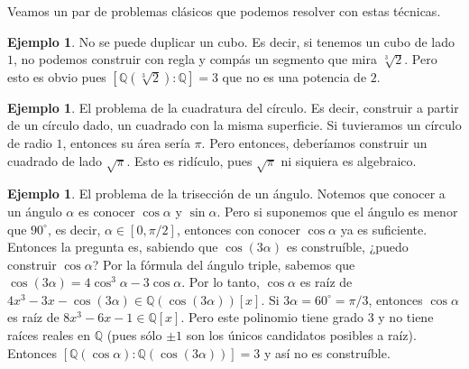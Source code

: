 \documentclass[12pt]{book}
\theoremstyle{definition}
\newtheorem{ex}[teo]{Ejemplo}
\newcommand{\QQ}{\mathbb{Q}}
\begin{document}
Veamos un par de problemas clásicos que podemos resolver con estas técnicas.

\begin{ex}
No se puede duplicar un cubo. Es decir, si tenemos un cubo de lado $1$, no podemos construir con regla y compás un segmento que mira $\sqrt[3]{2}$. Pero esto es obvio pues $[\QQ(\sqrt[3]{2}):\QQ]=3$ que no es una potencia de $2$.
\end{ex}

\begin{ex}
El problema de la cuadratura del círculo. Es decir, construir a partir de un círculo dado, un cuadrado con la misma superficie. Si tuvieramos un círculo de radio $1$, entonces su área sería $\pi$. Pero entonces, deberíamos construir un cuadrado de lado $\sqrt{\pi}$. Esto es ridículo, pues $\sqrt{\pi}$ ni siquiera es algebraico.
\end{ex}

\begin{ex}
El problema de la trisección de un ángulo. Notemos que conocer a un ángulo $\alpha$ es conocer $\cos \alpha$ y $\sin\alpha$. Pero si suponemos que el ángulo es menor que $90^\circ$, es decir, $\alpha\in [0,\pi/2]$, entonces con conocer $\cos\alpha$ ya es suficiente. Entonces la pregunta es, sabiendo que $\cos(3\alpha)$ es construíble, ¿puedo construir $\cos\alpha$? Por la fórmula del ángulo triple, sabemos que $\cos (3\alpha) = 4\cos^3 \alpha - 3\cos \alpha$. Por lo tanto, $\cos\alpha$ es raíz de $4x^3 - 3x - \cos(3\alpha)\in\QQ(\cos(3\alpha))[x]$. Si $3\alpha = 60^\circ = \pi/3$, entonces $\cos \alpha$ es raíz de $8x^3 - 6x -1\in\QQ[x]$. Pero este polinomio tiene grado $3$ y no tiene raíces reales en $\QQ$ (pues sólo $\pm 1$ son los únicos candidatos posibles a raíz). Entonces $[\QQ(\cos\alpha):\QQ(\cos(3\alpha))]=3$ y así no es construíble.
\end{ex}
\end{document}

